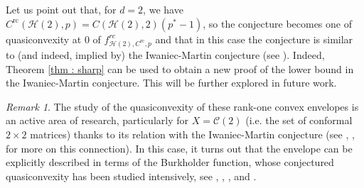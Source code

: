 \documentclass[11pt, a4paper, reqno]{elsarticle}
\theoremstyle{definition}
\theoremstyle{remark}
\newtheorem{remark}{Remark}
\begin{document}
Let us point out that, for $d=2$, we have 
$C^{\mathrm{rc}}(\mathcal H(2),p)=
C(\mathcal H(2), 2)(p^*-1)$, so the conjecture becomes 
one of quasiconvexity at $0$ of
$f_{\mathcal H(2), C^{\mathrm{rc}},p}^{rc}$
and that in this case the conjecture is 
similar to (and indeed, implied by)
the Iwaniec-Martin conjecture
(see \cite{Iwaniec1982OnExponents}).
Indeed, Theorem \ref{thm : sharp} can be used to obtain
a new proof of the lower bound in the 
Iwaniec-Martin conjecture.
This will be further
explored in future work.
\begin{remark}
The study of the quasiconvexity of these rank-one convex envelopes
is an active area of research, particularly for $X=\mathcal C(2)$ (i.e. the set of 
conformal $2\times 2$ matrices)
thanks to its relation with the Iwaniec-Martin conjecture (see \cite{BaernsteinII1997}, \cite{Iwaniec2002Nonlinear}, \cite{Astala2012BurkholderMappings}
for more on this connection). 
In this case, it turns out that the envelope can be explicitly 
described in terms of the Burkholder function, whose conjectured quasiconvexity
has been studied intensively, see \cite{Guerra2022}, \cite{Astala2023TheTheory}, \cite{Guerra2019}, \cite{AstalaIwaniecPrauseSaksman2015} and \cite{KariAstala2024}.    
\end{remark} 
\end{document}
